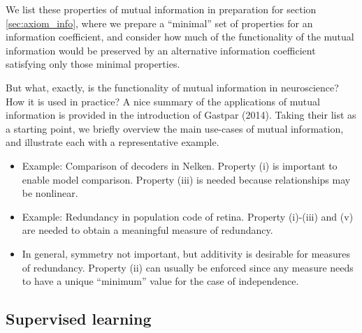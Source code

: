 \documentclass[12pt]{article}
\begin{document}
We list these properties of mutual information in preparation for
section \ref{sec:axiom_info}, where we prepare a ``minimal'' set of
properties for an information coefficient, and consider how much of
the functionality of the mutual information would be preserved by an
alternative information coefficient satisfying only those minimal
properties.

But what, exactly, is the functionality of mutual information in
neuroscience?  How it is used in practice?  A nice summary of the
applications of mutual information is provided in the introduction of
Gastpar (2014).  Taking their list as a starting point, we briefly
overview the main use-cases of mutual information, and illustrate each
with a representative example.



\begin{itemize}
\item Example: Comparison of decoders in Nelken.  
Property (i) is important to enable model comparison.  Property (iii)
is needed because relationships may be nonlinear.
\item Example: Redundancy in population code of retina.  
Property (i)-(iii) and (v) are needed to obtain a meaningful measure
of redundancy.
\item In general, symmetry not important, but additivity is desirable 
for measures of redundancy.  Property (ii) can usually be enforced
since any measure needs to have a unique ``minimum'' value for the
case of independence.
\end{itemize}

\subsection{Supervised learning}\label{sec:background_sl}
\end{document}
